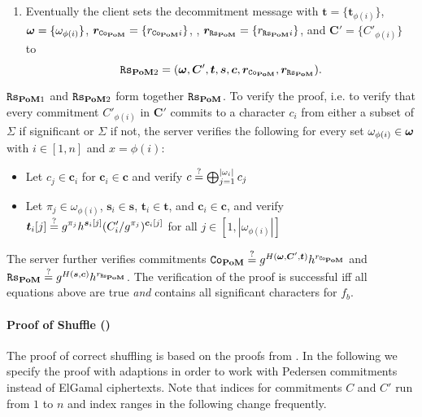 \begin{enumerate}
  \item %
    Eventually the client sets the decommitment message with $\bm t = \{\bm t_{\phi(i)} \}$, $\boldsymbol{\mathbf{\omega}}=\{\omega_{\phi(i)}\}$, $\bm r_{\mathtt{Co}_\mathsf{\bf PoM}}=\{r_{\mathtt{Co}_\mathsf{\bf PoM} i}\}$, , $\bm r_{\mathtt{Rs}_\mathsf{\bf PoM}}=\{r_{\mathtt{Rs}_\mathsf{\bf PoM} i}\}$, and $\bm C'=\{C'_{\phi(i)}\}$ to
    \[\mathtt{Rs}_{\mathsf{\bf PoM}2}=(\boldsymbol{\mathbf{\omega}}, \bm C', \bm t, \bm s, \bm c, \bm r_{\mathtt{Co}_\mathsf{\bf PoM}}, \bm r_{\mathtt{Rs}_\mathsf{\bf PoM}}).\]
\end{enumerate}

\noindent
$\mathtt{Rs}_{\mathsf{\bf PoM}1}$ and $\mathtt{Rs}_{\mathsf{\bf PoM}2}$ form together $\mathtt{Rs}_{\mathsf{\bf PoM}}$.
To verify the proof, i.e. to verify that every commitment $C'_{\phi(i)}$ in $\bm C'$ commits to a character $c_i$ from either a subset of $\Sigma$ if significant or $\Sigma$ if not, the server verifies the following for every set $\omega_{\phi(i)} \in \boldsymbol{\mathbf{\omega}}$ with $i\in[1,n]$ and $x=\phi(i)$:
\begin{itemize}
% 

  \item Let $c_j\in\bm c_i$ for $\bm c_i\in\bm c$ and verify
        $c \stackrel{?}{=} \bigoplus_{j=1}^{|\omega_i|}c_j$

  \item Let $\pi_j\in\omega_{\phi(i)}$, $\bm s_i \in \bm s$, $\bm t_i\in \bm t$, and $\bm c_i \in \bm c$, and verify
        $\displaystyle \bm t_{i}[j] \stackrel{?}{=} g^{\pi_j}h^{\bm s_i[j]}(C'_i/g^{\pi_j})^{\bm c_i[j]}$
        for all $j\in[1,|\omega_{\phi(i)}|]$
\end{itemize}
The server further verifies commitments $\mathtt{Co}_\mathsf{\bf PoM} \stackrel{?}{=} g^{H(\boldsymbol{\mathbf{\omega}}, \bm C', \bm t)} h^{r_{\mathtt{Co}_\mathsf{\bf PoM}}}$ and $\mathtt{Rs}_\mathsf{\bf PoM} \stackrel{?}{=} g^{H(\bm s, \bm c)} h^{r_{\mathtt{Rs}_\mathsf{\bf PoM}}}$.
The verification of the proof is successful iff all equations above are true \emph{and} \vect{\omega} contains all significant characters for $f_b$.

\paragraph{Proof of Shuffle (\PoS)}
The proof of correct shuffling \PoS is based on the proofs from \cite{FurukawaS01,Furukawa05}.
In the following we specify the proof with adaptions in order to work with Pedersen commitments instead of ElGamal ciphertexts.
Note that indices for commitments $C$ and $C'$ run from $1$ to $n$ and index ranges in the following change frequently.


